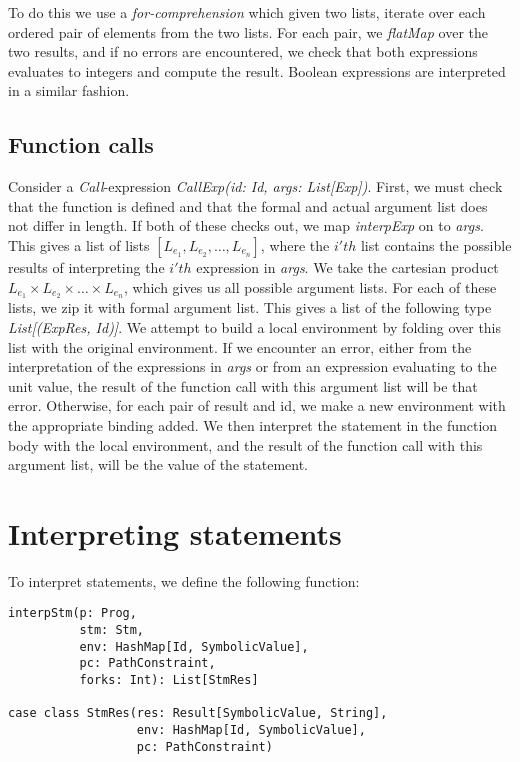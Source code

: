 To do this we use a \textsl{for-comprehension} which given two lists, iterate over each ordered pair of elements from the two lists.  For each pair, we \textsl{flatMap} over the two results, and if no errors are encountered, we check that both expressions evaluates to integers and compute the result.
Boolean expressions are interpreted in a similar fashion.

\subsection{Function calls}
Consider a \textsl{Call}-expression \textsl{CallExp(id: Id, args: List[Exp])}.
First, we must check that the function is defined and that the formal and actual argument list does not differ in length. If both of these checks out, we map \textsl{interpExp} on to \textsl{args}. This gives a list of lists $[L_{e_1}, L_{e_2}, \ldots, L_{e_n}]$, where the $i'th$ list contains the possible results of interpreting the $i'th$ expression in \textsl{args}.
We take the cartesian product $L_{e_1} \times L_{e_2} \times \ldots \times L_{e_n}$, which gives us all possible argument lists. For each of these lists, we zip it with formal argument list. This gives a list of the following type \textsl{List[(ExpRes, Id)]}. We attempt to build a local environment by folding over this list with the original environment. If we encounter an error, either from the interpretation of the expressions in \textsl{args} or from an expression evaluating to the unit value, the result of the function call with this argument list will be that error. Otherwise, for each pair of result and id, we make a new environment with the appropriate binding added. We then interpret the statement in the function body  with the local environment, and the result of the function call with this argument list, will be the value of the statement.

\section{Interpreting statements}

To interpret statements, we define the following function:

\begin{lstlisting}[style=simple]
interpStm(p: Prog, 
		  stm: Stm, 
		  env: HashMap[Id, SymbolicValue], 
		  pc: PathConstraint,
		  forks: Int): List[StmRes]
			  
case class StmRes(res: Result[SymbolicValue, String], 
				  env: HashMap[Id, SymbolicValue], 
				  pc: PathConstraint)
\end{lstlisting}

